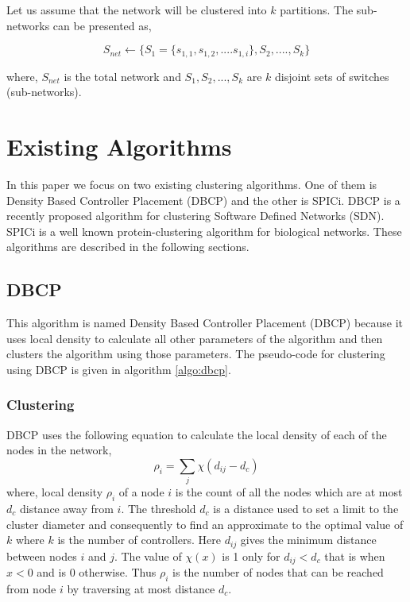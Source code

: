\documentclass[a4paper,twocolumn,preprint]{elsarticle}
\begin{document}
Let us assume that the network will be clustered into $k$ partitions. The sub-networks can be presented as,

\begin{equation} \label {eqn:clustering}
S_{net} \gets \{S_1=\{s_{1,1},s_{1,2},....s_{1,i}\},S_2,....,S_k\}
\end{equation}

where, $S_{net}$ is the total network and $S_1,S_2,...,S_k$ are $k$ disjoint sets of switches (sub-networks).

\section{Existing Algorithms} \label{existingalgo}
In this paper we focus on two existing clustering algorithms. One of them is Density Based Controller Placement (DBCP) and the other is SPICi. DBCP \cite{dbcp2017} is a recently proposed algorithm for clustering Software Defined Networks (SDN). SPICi\cite{spici2010} is a well known protein-clustering algorithm for biological networks. These algorithms are described in the following sections. 
\subsection{DBCP\cite{dbcp2017}}
This algorithm is named Density Based Controller Placement (DBCP) because it uses local density to calculate all other parameters of the algorithm and then clusters the algorithm using those parameters. The pseudo-code for clustering using DBCP is given in algorithm \ref{algo:dbcp}.
\subsubsection{Clustering} \label{dbcp:clustering}
DBCP uses the following equation to calculate the local density of each of the nodes in the network,
\begin{equation} \label{dbcp:density}
\rho_i=\sum_j\chi(d_{ij}-d_c)
\end{equation}
where, local density $\rho_i$ of a node $i$ is the count of all the nodes which are at most $d_c$ distance away from $i$. The threshold $d_c$ is a distance used to set a limit to the cluster diameter and consequently to find an approximate to the optimal value of $k$ where $k$ is the number of controllers.
Here $d_{ij}$ gives the minimum distance between nodes $i$ and $j$. The value of $\chi(x)$ is 1 only for $d_{ij}<d_c$ that is when $x<0$ and is 0 otherwise. Thus $\rho_i$ is the number of nodes that can be reached from node $i$ by traversing at most distance $d_c$.
\end{document}
